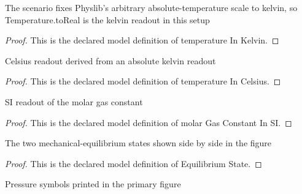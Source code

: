 \begin{definition}
  \label{def:physics:phyx-mini-0360:phyxminiproblems-problemphyxmini0360-temperatureinkelvin}
  The scenario fixes Physlib's arbitrary absolute-temperature scale to kelvin, so Temperature.toReal is the kelvin readout in this setup
\end{definition}
\begin{proof}
  This is the declared model definition of temperature In Kelvin.
\end{proof}
\begin{definition}
  \label{def:physics:phyx-mini-0360:phyxminiproblems-problemphyxmini0360-temperatureincelsius}
  Celsius readout derived from an absolute kelvin readout
\end{definition}
\begin{proof}
  This is the declared model definition of temperature In Celsius.
\end{proof}
\begin{definition}
  \label{def:physics:phyx-mini-0360:phyxminiproblems-problemphyxmini0360-molargasconstantinsi}
  SI readout of the molar gas constant
\end{definition}
\begin{proof}
  This is the declared model definition of molar Gas Constant In SI.
\end{proof}
\begin{definition}
  \label{def:physics:phyx-mini-0360:phyxminiproblems-problemphyxmini0360-equilibriumstate}
  The two mechanical-equilibrium states shown side by side in the figure
\end{definition}
\begin{proof}
  This is the declared model definition of Equilibrium State.
\end{proof}
\begin{definition}
  \label{def:physics:phyx-mini-0360:phyxminiproblems-problemphyxmini0360-figurepressurelabel}
  Pressure symbols printed in the primary figure
\end{definition}

